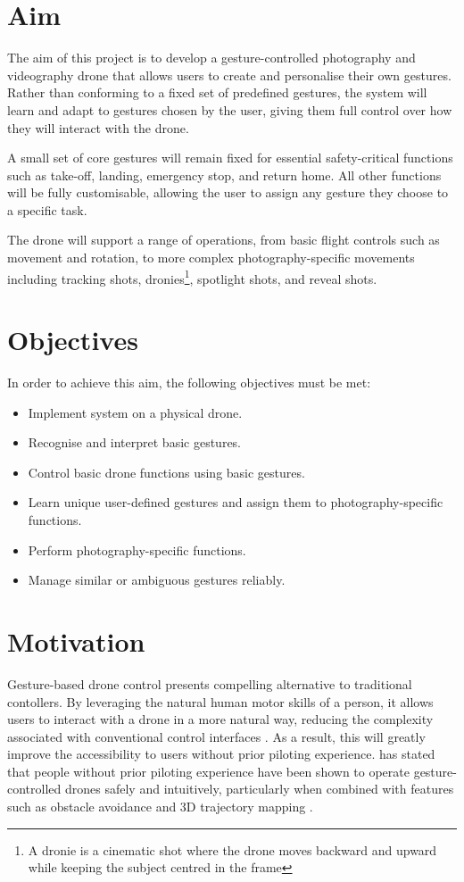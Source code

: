 \section{Aim}

The aim of this project is to develop a gesture-controlled photography and videography drone that allows users to create and personalise their own gestures. Rather than conforming to a fixed set of predefined gestures, the system will learn and adapt to gestures chosen by the user, giving them full control over how they will interact with the drone.

A small set of core gestures will remain fixed for essential safety-critical functions such as take-off, landing, emergency stop, and return home. All other functions will be fully customisable, allowing the user to assign any gesture they choose to a specific task.

The drone will support a range of operations, from basic flight controls such as movement and rotation, to more complex photography-specific movements including tracking shots, dronies\footnote{A dronie is a cinematic shot where the drone moves backward and upward while keeping the subject centred in the frame}, spotlight shots, and reveal shots.

\section{Objectives}

In order to achieve this aim, the following objectives must be met:
\begin{itemize}
    \item Implement system on a physical drone. 
    \item Recognise and interpret basic gestures.
    \item Control basic drone functions using basic gestures.
    \item Learn unique user-defined gestures and assign them to photography-specific functions.
    \item Perform photography-specific functions.
    \item Manage similar or ambiguous gestures reliably.
\end{itemize}

\section{Motivation}

Gesture-based drone control presents compelling alternative to traditional contollers. By leveraging the natural human motor skills of a person, it allows users to interact with a drone in a more natural way, reducing the complexity associated with conventional control interfaces \citep{Trinitatova2025}. As a result, this will greatly improve the accessibility to users without prior piloting experience. \cite{Taylor2025} has stated that people without prior piloting experience have been shown to operate gesture-controlled drones safely and intuitively, particularly when combined with features such as obstacle avoidance and 3D trajectory mapping \citep{Taylor2025}.

